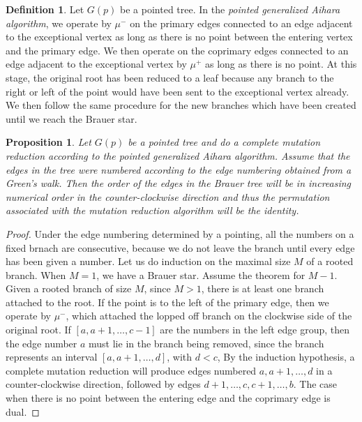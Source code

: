 \documentclass[11pt,english]{article}
\numberwithin{figure}{section}
\numberwithin{equation}{section}
\numberwithin{table}{section}
\newtheorem{prop}{Proposition}[section]
\theoremstyle{definition}
\newtheorem{defn}{Definition}[section]
\theoremstyle{remark}
\begin{document}
\begin{defn}
	Let $G(p)$ be a pointed tree.  In the \textit{pointed generalized Aihara algorithm}, we operate by $\mu^-$ on the primary edges connected to an edge adjacent to  the exceptional vertex as long as there is no point between the entering vertex and the primary edge.  We then operate on the coprimary edges 
	connected to an edge adjacent to the exceptional vertex by $\mu^+$ as long as there is no point.  At this stage, the original root has been reduced to a leaf because any branch to the right or left of the point would have been sent to the exceptional vertex already. 
	We then follow the same procedure for the new branches which have been created until we reach the Brauer star.
	
	
\end{defn}
\begin{prop}
		Let $G(p)$ be a pointed tree and do a complete mutation reduction according to the pointed generalized Aihara algorithm. Assume that the edges in the tree were numbered according to the edge numbering obtained from a Green's walk. Then the order of the edges in the Brauer tree will be in increasing numerical order in the counter-clockwise direction and thus the permutation associated with the mutation reduction algorithm will be the identity.  
\end{prop}

\begin{proof}
	Under the edge numbering determined by a pointing, all the numbers on a fixed brnach are consecutive, because we do not leave the branch until every edge has been given a number. Let us do induction on the maximal size $M$ of a rooted branch. When $M=1$, we have a Brauer star.  Assume the theorem for $M-1$. Given a rooted branch of size $M$, since $M>1$, there is at least one branch attached to the root.  If the point is to the left of the primary edge, then we operate by $\mu^-$, which attached the lopped off branch on the clockwise side of the original root.  If $[a,a+1,\dots, c-1]$ are the numbers in the left edge group, then the edge number $a$ must lie in the branch being removed,  since the branch represents an interval $[a,a+1,\dots,d]$, with $d<c$, By the induction hypothesis, a complete mutation reduction will produce  edges numbered $a, a+1, \dots, d$ in a counter-clockwise direction, followed by edges $d+1,\dots, c,c+1,\dots, b$.
	The case when there is no point between the entering edge and the coprimary edge is dual.  
	
\end{proof}
\end{document}
